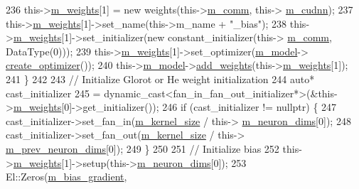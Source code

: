 \begin{DoxyCode}
236       this->\hyperlink{classlbann_1_1Layer_a7954e30fbf9100a6ba4b56d02767a469}{m\_weights}[1] = \textcolor{keyword}{new} weights(this->\hyperlink{classlbann_1_1Layer_a5de05c52f22e0bbd7c703bec3ad4dbf2}{m\_comm}, this->
      \hyperlink{classlbann_1_1Layer_a08dbb94239e3b8c96329786c57c72e21}{m\_cudnn});
237       this->\hyperlink{classlbann_1_1Layer_a7954e30fbf9100a6ba4b56d02767a469}{m\_weights}[1]->set\_name(this->m\_name + \textcolor{stringliteral}{"\_bias"});
238       this->\hyperlink{classlbann_1_1Layer_a7954e30fbf9100a6ba4b56d02767a469}{m\_weights}[1]->set\_initializer(\textcolor{keyword}{new} constant\_initializer(this->
      \hyperlink{classlbann_1_1Layer_a5de05c52f22e0bbd7c703bec3ad4dbf2}{m\_comm}, DataType(0)));
239       this->\hyperlink{classlbann_1_1Layer_a7954e30fbf9100a6ba4b56d02767a469}{m\_weights}[1]->set\_optimizer(\hyperlink{classlbann_1_1Layer_a3d9315e99574166f2f33e37b572021d2}{m\_model}->
      \hyperlink{classlbann_1_1model_a0d2d5a1eac592e5721a81a9b9ea4b7f2}{create\_optimizer}());
240       this->\hyperlink{classlbann_1_1Layer_a3d9315e99574166f2f33e37b572021d2}{m\_model}->\hyperlink{classlbann_1_1model_af35fca77e75eb6dd570e4727aa3d5b6b}{add\_weights}(this->\hyperlink{classlbann_1_1Layer_a7954e30fbf9100a6ba4b56d02767a469}{m\_weights}[1]);
241     \}
242 
243     \textcolor{comment}{// Initialize Glorot or He weight initialization}
244     \textcolor{keyword}{auto}* cast\_initializer
245       = \textcolor{keyword}{dynamic\_cast<}fan\_in\_fan\_out\_initializer*\textcolor{keyword}{>}(&this->\hyperlink{classlbann_1_1Layer_a7954e30fbf9100a6ba4b56d02767a469}{m\_weights}[0]->get\_initializer());
246     \textcolor{keywordflow}{if} (cast\_initializer != \textcolor{keyword}{nullptr}) \{
247       cast\_initializer->set\_fan\_in(\hyperlink{classlbann_1_1base__convolution__layer_aa9da3e44499643a86bd611b5eb500dd4}{m\_kernel\_size} / this->
      \hyperlink{classlbann_1_1Layer_abb34bb8031f57a483e2e327a5f229f48}{m\_neuron\_dims}[0]);
248       cast\_initializer->set\_fan\_out(\hyperlink{classlbann_1_1base__convolution__layer_aa9da3e44499643a86bd611b5eb500dd4}{m\_kernel\_size} / this->
      \hyperlink{classlbann_1_1Layer_ae204d1a2a79606eaa117273857ff62a3}{m\_prev\_neuron\_dims}[0]);
249     \}
250 
251     \textcolor{comment}{// Initialize bias}
252     this->\hyperlink{classlbann_1_1Layer_a7954e30fbf9100a6ba4b56d02767a469}{m\_weights}[1]->setup(this->\hyperlink{classlbann_1_1Layer_abb34bb8031f57a483e2e327a5f229f48}{m\_neuron\_dims}[0]);
253     El::Zeros(\hyperlink{classlbann_1_1base__convolution__layer_a2ee1db4a1a74f167e3472d5ed7075179}{m\_bias\_gradient},

\end{DoxyCode}
